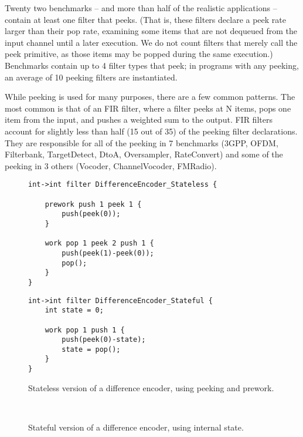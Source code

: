 \mybegin

  Twenty two
benchmarks -- and more than half of the realistic applications --
contain at least one filter that peeks.  (That is, these filters
declare a peek rate larger than their pop rate, examining some items
that are not dequeued from the input channel until a later execution.
We do not count filters that merely call the peek primitive, as those
items may be popped during the same execution.)  Benchmarks contain up
to 4 filter types that peek; in programs with any peeking, an average
of 10 peeking filters are instantiated.

While peeking is used for many purposes, there are a few common
patterns.  The most common is that of an FIR filter, where a filter
peeks at N items, pops one item from the input, and pushes a weighted
sum to the output.  FIR filters account for slightly less than half
(15 out of 35) of the peeking filter declarations.  They are
responsible for all of the peeking in 7 benchmarks (3GPP, OFDM,
Filterbank, TargetDetect, DtoA, Oversampler, RateConvert) and some of
the peeking in 3 others (Vocoder, ChannelVocoder, FMRadio).

\begin{figure}[t]

\begin{minipage}{0.5\textwidth}
\centering
\ninepoint
\begin{verbatim}
int->int filter DifferenceEncoder_Stateless {

    prework push 1 peek 1 {
        push(peek(0));
    }

    work pop 1 peek 2 push 1 {
        push(peek(1)-peek(0));
        pop();
    }
}
\end{verbatim}
\end{minipage}
\begin{minipage}{0.5\textwidth}
\centering
\ninepoint
\begin{verbatim}
int->int filter DifferenceEncoder_Stateful {
    int state = 0;

    work pop 1 push 1 {
        push(peek(0)-state);
        state = pop();
    }
}
\end{verbatim}
\end{minipage}

\begin{minipage}{0.45\textwidth}
\centering
\caption{Stateless version of a difference encoder, using peeking
and prework.\protect\label{fig:diff-stateless}}
\end{minipage}
\begin{minipage}{0.05\textwidth}
~
\end{minipage}
\begin{minipage}{0.45\textwidth}
\centering
\caption{Stateful version of a difference encoder, using 
internal state.\protect\label{fig:diff-stateful}}
\end{minipage}
\end{figure}

